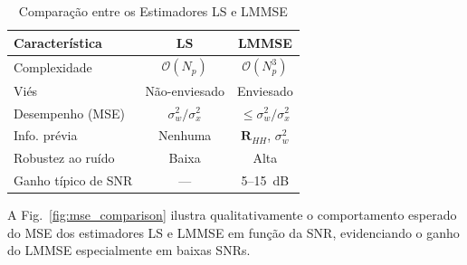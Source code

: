 \documentclass[conference]{IEEEtran}
\begin{document}
\begin{table}[htbp]
\centering
\caption{Comparação entre os Estimadores LS e LMMSE}
\label{tab:ls_vs_lmmse}
\begin{tabular}{@{}lcc@{}}
\toprule
\textbf{Característica} & \textbf{LS} & \textbf{LMMSE} \\
\midrule
Complexidade & $\mathcal{O}(N_p)$ & $\mathcal{O}(N_p^3)$ \\
Viés & Não-enviesado & Enviesado \\
Desempenho (MSE) & $\sigma_w^2/\sigma_x^2$ & $\leq \sigma_w^2/\sigma_x^2$ \\
Info. prévia & Nenhuma & $\mathbf{R}_{HH}$, $\sigma_w^2$ \\
Robustez ao ruído & Baixa & Alta \\
Ganho típico de SNR & --- & 5--15~dB \\
\bottomrule
\end{tabular}
\end{table}

A Fig.~\ref{fig:mse_comparison} ilustra qualitativamente o comportamento esperado do MSE dos estimadores LS e LMMSE em função da SNR, evidenciando o ganho do LMMSE especialmente em baixas SNRs.
\end{document}
